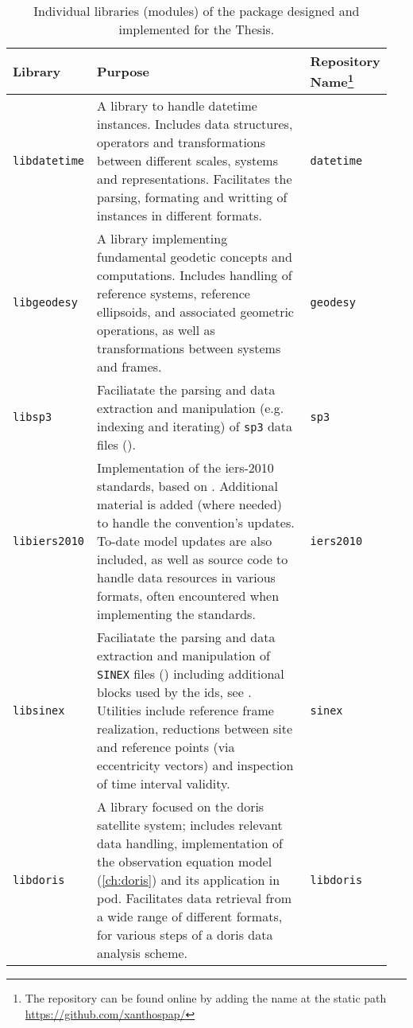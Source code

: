 \begin{table}[h!]
    \centering
    \begin{tabular}{p{0.20\linewidth} | p{0.60\linewidth} | p{0.15\linewidth}}
        \textbf{Library} & \textbf{Purpose} & \textbf{Repository Name}\footnote{The repository can be found online by adding the name at the static path \url{https://github.com/xanthospap/}} \\
        \toprule
        
        \texttt{libdatetime} & A library to handle datetime instances. Includes data structures, 
          operators and transformations between different scales, systems and representations. 
          Facilitates the parsing, formating and writting of instances in different formats.
          & \texttt{datetime} \\
        
        \texttt{libgeodesy} & A library implementing fundamental geodetic concepts and 
          computations. Includes handling of reference systems, reference ellipsoids, 
          and associated geometric operations, as well as transformations between 
          systems and frames. & \texttt{geodesy} \\

        \texttt{libsp3} & Faciliatate the parsing and data extraction and manipulation 
          (e.g. indexing and iterating) of \texttt{sp3} data files (\cite{Hilla2010}). 
          & \texttt{sp3} \\
        
        \texttt{libiers2010} & Implementation of the \gls{iers}-2010 standards, based on  
          \cite{iers2010}. Additional material is added (where needed) to handle the 
          convention's updates. To-date model updates are also included, as well as 
          source code to handle data resources in various formats, often encountered 
          when implementing the standards.
          & \texttt{iers2010} \\
        
        \texttt{libsinex} & Faciliatate the parsing and data extraction and manipulation 
          of \texttt{SINEX} files (\cite{Sinex202}) including additional blocks 
          used by the \gls{ids}, see \cite{Moreaux2023}. Utilities include reference 
          frame realization, reductions between site and reference points (via eccentricity 
          vectors) and inspection of time interval validity.
          & \texttt{sinex} \\
        
        \texttt{libdoris} & A library focused on the \gls{doris} satellite system; includes 
          relevant data handling, implementation of the observation equation model 
          (\autoref{ch:doris}) and its application in \gls{pod}. Facilitates data 
          retrieval from a wide range of different formats, for various steps of a
          \gls{doris} data analysis scheme.
          & \texttt{libdoris} \\
        \bottomrule
    \end{tabular}
    \caption{Individual libraries (modules) of the package designed and implemented for the Thesis.}
    \label{table:software-components2}
\end{table}

